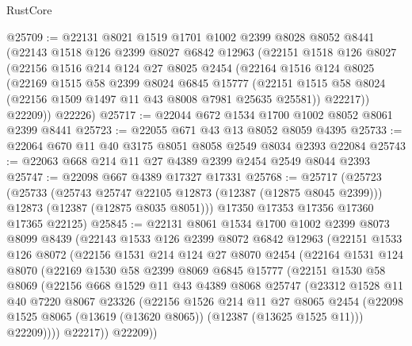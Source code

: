 \begin{lexlean}{RustCore}
\begin{coremodule}
@25709 := @22131
    @8021
    @1519
    @1701
    @1002
    @2399
    @8028
    @8052
    @8441
    (@22143
      @1518
      @126
      @2399
      @8027
      @6842
      @12963
      (@22151
        @1518
        @126
        @8027
        (@22156
          @1516
          @214
          @124
          @27
          @8025
          @2454
          (@22164
            @1516
            @124
            @8025
            (@22169
              @1515
              @58
              @2399
              @8024
              @6845
              @15777
              (@22151 @1515 @58 @8024 (@22156 @1509 @1497 @11 @43 @8008 @7981 @25635 @25581))
              @22217))
          @22209))
      @22226)
@25717 := @22044 @672 @1534 @1700 @1002 @8052 @8061 @2399 @8441
@25723 := @22055 @671 @43 @13 @8052 @8059 @4395
@25733 := @22064 @670 @11 @40 @3175 @8051 @8058 @2549 @8034 @2393 @22084
@25743 := @22063 @668 @214 @11 @27 @4389 @2399 @2454 @2549 @8044 @2393
@25747 := @22098 @667 @4389 @17327 @17331
@25768 := @25717
    (@25723
      (@25733
        (@25743 @25747 @22105 @12873 (@12387 (@12875 @8045 @2399)))
        @12873
        (@12387 (@12875 @8035 @8051)))
      @17350
      @17353
      @17356
      @17360
      @17365
      @22125)
@25845 := @22131
    @8061
    @1534
    @1700
    @1002
    @2399
    @8073
    @8099
    @8439
    (@22143
      @1533
      @126
      @2399
      @8072
      @6842
      @12963
      (@22151
        @1533
        @126
        @8072
        (@22156
          @1531
          @214
          @124
          @27
          @8070
          @2454
          (@22164
            @1531
            @124
            @8070
            (@22169
              @1530
              @58
              @2399
              @8069
              @6845
              @15777
              (@22151
                @1530
                @58
                @8069
                (@22156
                  @668
                  @1529
                  @11
                  @43
                  @4389
                  @8068
                  @25747
                  (@23312
                    @1528
                    @11
                    @40
                    @7220
                    @8067
                    @23326
                    (@22156
                      @1526
                      @214
                      @11
                      @27
                      @8065
                      @2454
                      (@22098 @1525 @8065 (@13619 (@13620 @8065)) (@12387 (@13625 @1525 @11)))
                      @22209))))
              @22217))
          @22209))

\end{coremodule}
\end{lexlean}
